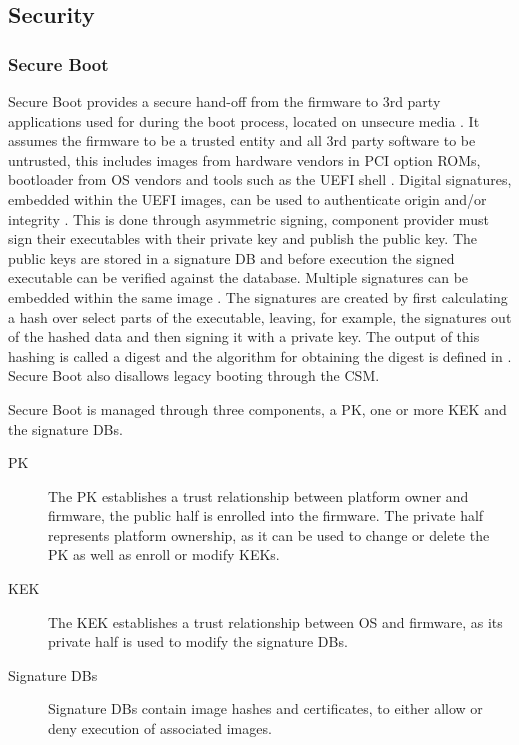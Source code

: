 
\subsection{Security}

\subsubsection{Secure Boot}

Secure Boot provides a secure hand-off from the firmware to 3rd party applications used for during the boot process, located on unsecure media \cite{tianocore-understanding-uefi-secure-boot-chain}\cite[32.2 and 32.5.1]{uefi-spec}.
It assumes the firmware to be a trusted entity and all 3rd party software to be untrusted, this includes images from hardware vendors in \ac{PCI} option \acp{ROM}, bootloader from \ac{OS} vendors and tools such as the \ac{UEFI} shell \cite{tianocore-understanding-uefi-secure-boot-chain}.
Digital signatures, embedded within the \ac{UEFI} images, can be used to authenticate origin and/or integrity \cite[32.2]{uefi-spec}.
This is done through asymmetric signing, component provider must sign their executables with their private key and publish the public key.
The public keys are stored in a signature \ac{DB} and before execution the signed executable can be verified against the database.
Multiple signatures can be embedded within the same image \cite[32.2.2]{uefi-spec}.
The signatures are created by first calculating a hash over select parts of the executable, leaving, for example, the signatures out of the hashed data and then signing it with a private key.
The output of this hashing is called a digest and the algorithm for obtaining the digest is defined in \cite{microsoft-pe-signature-format}.
Secure Boot also disallows legacy booting through the \ac{CSM}.

Secure Boot is managed through three components, a \ac{PK}, one or more \ac{KEK} and the signature \acp{DB}.

\begin{description}
    \item[\ac{PK}]
        The \ac{PK} establishes a trust relationship between platform owner and firmware, the public half is enrolled into the firmware.
        The private half represents platform ownership, as it can be used to change or delete the \ac{PK} as well as enroll or modify \acp{KEK}.
    \item[\ac{KEK}]
        The \ac{KEK} establishes a trust relationship between \ac{OS} and firmware, as its private half is used to modify the signature \acp{DB}.
    \item[Signature \acfp{DB}]
        Signature \acp{DB} contain image hashes and certificates, to either allow or deny execution of associated images.
\end{description}

